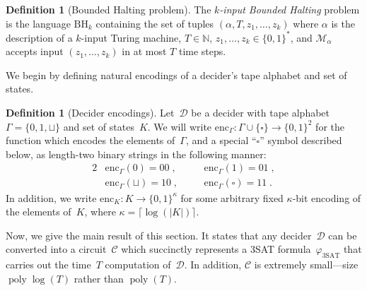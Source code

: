 \documentclass[11pt]{article}
\theoremstyle{definition}
\newtheorem{definition}[theorem]{Definition}
\newcommand{\N}{\ensuremath{\mathbb{N}}}
\DeclareMathOperator{\poly}{poly}
\newcommand{\decider}{\mathcal{D}}
\renewcommand{\cal}[1]{\mathcal{#1}}
\newcommand{\BoundedHalting}{\mathrm{BH}}
\newcommand{\circuit}{\mathcal{C}}
\begin{document}

\begin{definition}[Bounded Halting problem]
	The \emph{$k$-input Bounded Halting} problem is the language
  $\BoundedHalting_k$ containing the set of tuples $(\alpha, T, z_1,\ldots,z_k)$
  where $\alpha$ is the description of a $k$-input Turing machine, $T \in \N$,
  $z_1, \ldots, z_k \in \{0,1\}^*$, and $\cal{M}_\alpha$ accepts input $(z_1,
  \ldots, z_k)$ in at most $T$ time steps.
\end{definition}

We begin by defining natural encodings of a decider's tape alphabet and set of
states.

\begin{definition}[Decider encodings]
  Let~$\decider$ be a decider with tape alphabet $\Gamma = \{0, 1, \sqcup\}$ and
  set of states~$K$.
  We will write $\mathrm{enc}_{\Gamma}: \Gamma \cup \{\square\} \rightarrow \{0,
  1\}^2$ for the function which encodes the elements of~$\Gamma$, and a special
  ``$\square$'' symbol described below, as length-two binary strings in the
  following manner:
  \begin{alignat*}{2}
    & \mathrm{enc}_{\Gamma}(0) = 00\;,\quad
    && \mathrm{enc}_{\Gamma}(1) = 01\;,\\
    & \mathrm{enc}_{\Gamma}(\sqcup) = 10\;,\quad
    && \mathrm{enc}_{\Gamma}(\square) = 11\;.
  \end{alignat*}
  In addition, we write $\mathrm{enc}_K : K \rightarrow \{0, 1\}^\kappa$ for
  some arbitrary fixed $\kappa$-bit encoding of the elements of~$K$, where
  $\kappa = \lceil \log(|K|) \rceil$.
\end{definition}

Now, we give the main result of this section.
It states that any decider~$\decider$ can be converted into a circuit~$\circuit$
which succinctly represents a 3SAT formula~$\varphi_{\mathrm{3SAT}}$ that
carries out the time~$T$ computation of~$\decider$.
In addition, $\circuit$ is extremely small---size $\poly \log(T)$ rather than
$\poly(T)$.
\end{document}
